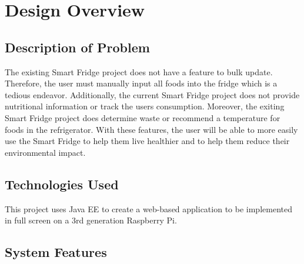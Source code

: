 \section{Design Overview}

\subsection{Description of Problem} The existing Smart Fridge project does not have a feature to bulk update. Therefore, the user must manually input all foods into the fridge which is a tedious endeavor. Additionally, the current Smart Fridge project does not provide nutritional information or track the users consumption. Moreover, the exiting Smart Fridge project does determine waste or recommend a temperature for foods in the refrigerator. With these features, the user will be able to more easily use the Smart Fridge to help them live healthier and to help them reduce their environmental impact. 
\subsection{Technologies Used} This project uses Java EE to create a web-based application to be implemented in full screen on a 3rd generation Raspberry Pi. 
\subsection{System Features} 


